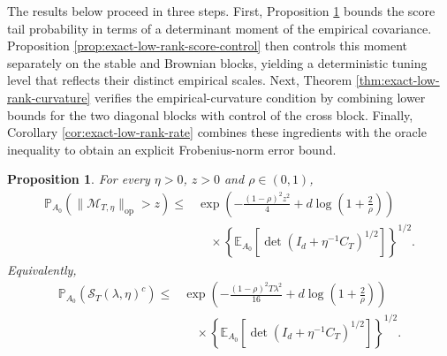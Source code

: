 \documentclass[11pt]{article}
\newtheorem{proposition}[theorem]{Proposition}
\begin{document}
The results below proceed in three steps. First, Proposition \ref{prop:general-score-control} bounds the
score tail probability in terms of a determinant moment of the empirical
covariance. Proposition \ref{prop:exact-low-rank-score-control} then controls this moment separately on the
stable and Brownian blocks, yielding a deterministic tuning level that reflects
their distinct empirical scales. Next, Theorem \ref{thm:exact-low-rank-curvature} verifies the empirical-curvature
condition by combining lower bounds for the two diagonal blocks with control of
the cross block. Finally, Corollary \ref{cor:exact-low-rank-rate} combines these ingredients with the
oracle inequality to obtain an explicit Frobenius-norm error bound.

\begin{proposition}%
\label{prop:general-score-control}
For every $\eta>0$, $z>0$ and $\rho\in(0,1)$,
\begin{equation}
\begin{aligned}
    \mathbb P_{A_0}\!\left(
        \|\mathcal M_{T,\eta}\|_{\mathrm{op}}>z
    \right)
    \leq{}&
    \exp\!\left(
        -\frac{(1-\rho)^2z^2}{4}
        +d\log\!\left(1+\frac2\rho\right)
    \right) \\
    &\quad\times
    \left\{
        \mathbb E_{A_0}\!\left[
            \det\!\left(I_d+\eta^{-1}C_T\right)^{1/2}
        \right]
    \right\}^{1/2}.
\end{aligned}
\label{eq:general-operator-score-bound}
\end{equation}
Equivalently,
\begin{equation}
\begin{aligned}
    \mathbb P_{A_0}\!\left(
        \mathcal S_T(\lambda,\eta)^c
    \right)
    \leq{}&
    \exp\!\left(
        -\frac{(1-\rho)^2T\lambda^2}{16}
        +d\log\!\left(1+\frac2\rho\right)
    \right) \\
    &\quad\times
    \left\{
        \mathbb E_{A_0}\!\left[
            \det\!\left(I_d+\eta^{-1}C_T\right)^{1/2}
        \right]
    \right\}^{1/2}.
\end{aligned}
\label{eq:general-score-event-bound}
\end{equation}
\end{proposition}
\end{document}
